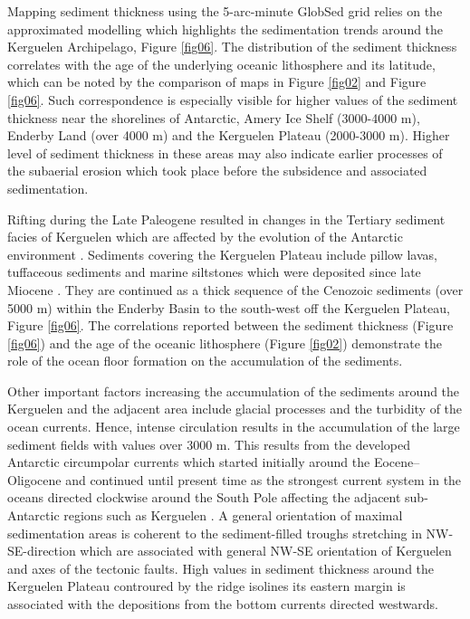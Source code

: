 \documentclass[geomatics,article,submit,pdftex,moreauthors]{Definitions/mdpi}
\begin{document}
Mapping sediment thickness using the 5-arc-minute GlobSed grid relies on the approximated modelling which highlights the sedimentation trends around the Kerguelen Archipelago, Figure \ref{fig06}. The distribution of the sediment thickness correlates with the age of the underlying oceanic lithosphere and its latitude, which can be noted by the comparison of maps in Figure \ref{fig02} and Figure \ref{fig06}. Such correspondence is especially visible for higher values of the sediment thickness near the shorelines of Antarctic, Amery Ice Shelf (3000-4000 m), Enderby Land (over 4000 m) and the Kerguelen Plateau (2000-3000 m). Higher level of sediment thickness in these areas may also indicate earlier processes of the subaerial erosion which took place before the subsidence and associated sedimentation. 

Rifting during the Late Paleogene resulted in changes in the Tertiary sediment facies of Kerguelen which are affected by the evolution of the Antarctic environment \cite{Froehlich}. Sediments covering the Kerguelen Plateau include pillow lavas, tuffaceous sediments and marine siltstones which were deposited since late Miocene \cite{Duncan}. They are continued as a thick sequence of the Cenozoic sediments (over 5000 m) within the Enderby Basin to the south-west off the Kerguelen Plateau, Figure \ref{fig06}. The correlations reported between the sediment thickness (Figure \ref{fig06}) and the age of the oceanic lithosphere (Figure \ref{fig02}) demonstrate the role of the ocean floor formation on the accumulation of the sediments. 

Other important factors increasing the accumulation of the sediments around the Kerguelen and the adjacent area include glacial processes and the turbidity of the ocean currents. Hence, intense circulation results in the accumulation of the large sediment fields with values over 3000 m. This results from the developed Antarctic circumpolar currents which started initially around the Eocene--Oligocene and continued until present time as the strongest current system in the oceans directed clockwise around the South Pole affecting the adjacent sub-Antarctic regions such as Kerguelen \cite{Huang,ROBERT200237}. A general orientation of maximal sedimentation areas is coherent to the sediment-filled troughs stretching in NW-SE-direction which are associated with general NW-SE orientation of Kerguelen and axes of the tectonic faults. High values in sediment thickness around the Kerguelen Plateau controured by the ridge isolines its eastern margin is associated with the depositions from the bottom currents directed westwards.
\end{document}
